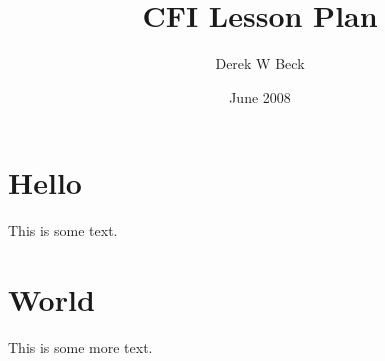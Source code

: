 \documentclass[twoside,openright]{report}
\title{CFI Lesson Plan}
\author{Derek W Beck}
\date{June 2008}
\begin{document}
\maketitle
\tableofcontents

\chapter{Hello}

This is some text.

\chapter{World}

This is some more text.
\end{document}
